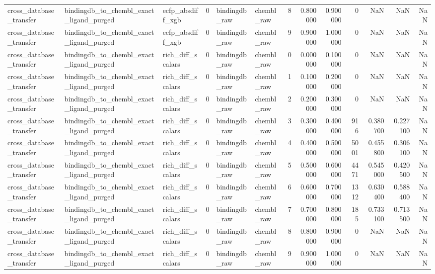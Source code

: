 \begin{longtable}{lllrllrrrrrrr}
cross\_database\_transfer & bindingdb\_to\_chembl\_exact\_ligand\_purged & ecfp\_absdiff\_xgb & 0 & bindingdb\_raw & chembl\_raw & 8 & 0.800000 & 0.900000 & 0 & NaN & NaN & NaN \\
cross\_database\_transfer & bindingdb\_to\_chembl\_exact\_ligand\_purged & ecfp\_absdiff\_xgb & 0 & bindingdb\_raw & chembl\_raw & 9 & 0.900000 & 1.000000 & 0 & NaN & NaN & NaN \\
cross\_database\_transfer & bindingdb\_to\_chembl\_exact\_ligand\_purged & rich\_diff\_scalars & 0 & bindingdb\_raw & chembl\_raw & 0 & 0.000000 & 0.100000 & 0 & NaN & NaN & NaN \\
cross\_database\_transfer & bindingdb\_to\_chembl\_exact\_ligand\_purged & rich\_diff\_scalars & 0 & bindingdb\_raw & chembl\_raw & 1 & 0.100000 & 0.200000 & 0 & NaN & NaN & NaN \\
cross\_database\_transfer & bindingdb\_to\_chembl\_exact\_ligand\_purged & rich\_diff\_scalars & 0 & bindingdb\_raw & chembl\_raw & 2 & 0.200000 & 0.300000 & 0 & NaN & NaN & NaN \\
cross\_database\_transfer & bindingdb\_to\_chembl\_exact\_ligand\_purged & rich\_diff\_scalars & 0 & bindingdb\_raw & chembl\_raw & 3 & 0.300000 & 0.400000 & 916 & 0.380700 & 0.227100 & NaN \\
cross\_database\_transfer & bindingdb\_to\_chembl\_exact\_ligand\_purged & rich\_diff\_scalars & 0 & bindingdb\_raw & chembl\_raw & 4 & 0.400000 & 0.500000 & 5001 & 0.455800 & 0.306100 & NaN \\
cross\_database\_transfer & bindingdb\_to\_chembl\_exact\_ligand\_purged & rich\_diff\_scalars & 0 & bindingdb\_raw & chembl\_raw & 5 & 0.500000 & 0.600000 & 4471 & 0.545000 & 0.420500 & NaN \\
cross\_database\_transfer & bindingdb\_to\_chembl\_exact\_ligand\_purged & rich\_diff\_scalars & 0 & bindingdb\_raw & chembl\_raw & 6 & 0.600000 & 0.700000 & 1312 & 0.630400 & 0.588400 & NaN \\
cross\_database\_transfer & bindingdb\_to\_chembl\_exact\_ligand\_purged & rich\_diff\_scalars & 0 & bindingdb\_raw & chembl\_raw & 7 & 0.700000 & 0.800000 & 185 & 0.733100 & 0.713500 & NaN \\
cross\_database\_transfer & bindingdb\_to\_chembl\_exact\_ligand\_purged & rich\_diff\_scalars & 0 & bindingdb\_raw & chembl\_raw & 8 & 0.800000 & 0.900000 & 0 & NaN & NaN & NaN \\
cross\_database\_transfer & bindingdb\_to\_chembl\_exact\_ligand\_purged & rich\_diff\_scalars & 0 & bindingdb\_raw & chembl\_raw & 9 & 0.900000 & 1.000000 & 0 & NaN & NaN & NaN \\

\end{longtable}
